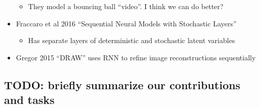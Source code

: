 \begin{itemize}
\begin{itemize}
        \item They model a bouncing ball ``video''. I think we can do better?
    \end{itemize}
    \item Fraccaro et al 2016 ``Sequential Neural Models with Stochastic Layers''
    \begin{itemize}
        \item Has separate layers of deterministic and stochastic latent variables
    \end{itemize}
    \item Gregor 2015 ``DRAW'' uses RNN to refine image reconstructions sequentially
\end{itemize}

\subsection*{TODO: briefly summarize our contributions and tasks}

